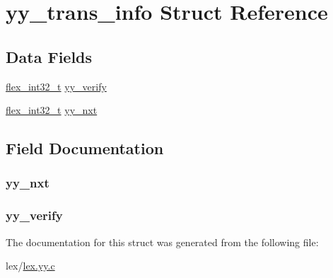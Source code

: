 \hypertarget{structyy__trans__info}{}\section{yy\+\_\+trans\+\_\+info Struct Reference}
\label{structyy__trans__info}
\subsection*{Data Fields}
\begin{DoxyCompactItemize}
\item 
\hyperlink{lex_8yy_8c_a838ce943cf44ef7769480714fc6c3ba9}{flex\+\_\+int32\+\_\+t} \hyperlink{structyy__trans__info_a5faf5583708f5fa457bc1cb9bab86e38}{yy\+\_\+verify}
\item 
\hyperlink{lex_8yy_8c_a838ce943cf44ef7769480714fc6c3ba9}{flex\+\_\+int32\+\_\+t} \hyperlink{structyy__trans__info_a51bfd9e47041873b7b8075c677d1cfe1}{yy\+\_\+nxt}
\end{DoxyCompactItemize}


\subsection{Field Documentation}
\subsubsection[{\texorpdfstring{yy\+\_\+nxt}{yy_nxt}}]{ yy\+\_\+nxt}\hypertarget{structyy__trans__info_a51bfd9e47041873b7b8075c677d1cfe1}{}\label{structyy__trans__info_a51bfd9e47041873b7b8075c677d1cfe1}
\subsubsection[{\texorpdfstring{yy\+\_\+verify}{yy_verify}}]{ yy\+\_\+verify}\hypertarget{structyy__trans__info_a5faf5583708f5fa457bc1cb9bab86e38}{}\label{structyy__trans__info_a5faf5583708f5fa457bc1cb9bab86e38}


The documentation for this struct was generated from the following file\+:\begin{DoxyCompactItemize}
\item 
lex/\hyperlink{lex_8yy_8c}{lex.\+yy.\+c}\end{DoxyCompactItemize}

